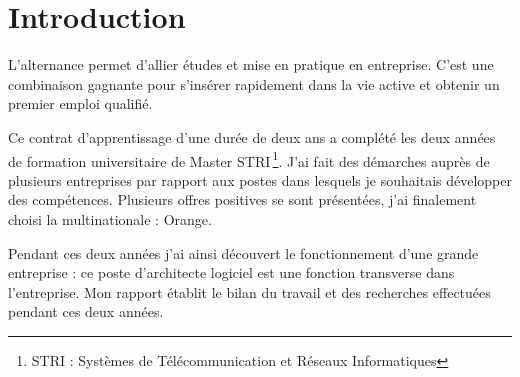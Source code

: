 \section*{Introduction} %

L'alternance permet d'allier études et mise en pratique en entreprise.
C'est une combinaison gagnante pour s'insérer rapidement dans la vie active et obtenir un premier emploi qualifié.

Ce contrat d'apprentissage d'une durée de deux ans a complété les deux années de formation universitaire de Master STRI\,\footnote{STRI : Systèmes de Télécommunication et Réseaux Informatiques}.
J'ai fait des démarches auprès de plusieurs entreprises par rapport aux postes dans lesquels je souhaitais développer des compétences.
Plusieurs offres positives se sont présentées, j'ai finalement choisi la multinationale : Orange.

Pendant ces deux années j'ai ainsi découvert le fonctionnement d'une grande entreprise : ce poste d'architecte logiciel est une fonction transverse dans l'entreprise.
Mon rapport établit le bilan du travail et des recherches effectuées pendant ces deux années.
